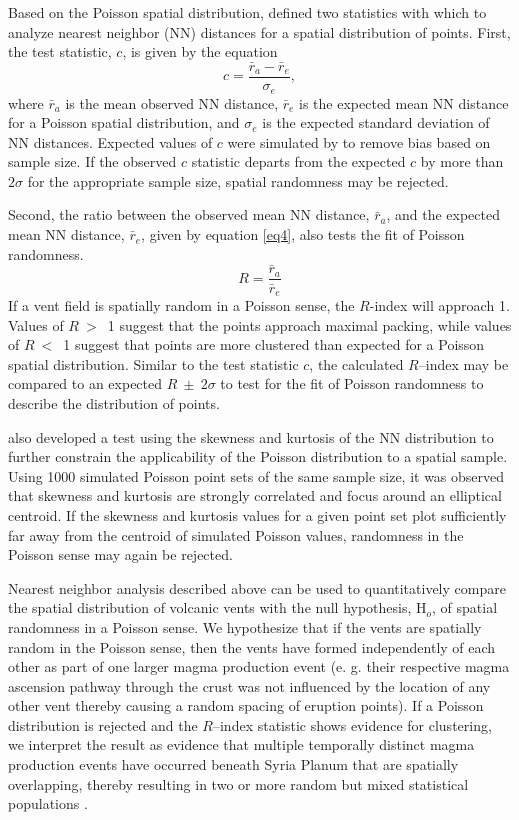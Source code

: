Based on the Poisson spatial distribution, \citet{Clark1954} defined two statistics with which to analyze nearest neighbor (NN) distances for a spatial distribution of points. First, the test statistic, $c$, is given by the equation 
\begin{equation}
c= \frac{\bar{r}_a -\bar{r}_e}{\sigma_e},  \label{eq3}
\end{equation}
where $\bar{r}_a$ is the mean observed NN distance, $\bar{r}_e$ is the expected mean NN distance for a Poisson spatial distribution, and $\sigma_e$ is the expected standard deviation of NN distances. Expected values of $c$ were simulated by \citet{Baloga2007} to remove bias based on sample size. If the observed $c$ statistic departs from the expected $c$ by more than $2\sigma$ for the appropriate sample size, spatial randomness may be rejected.

Second, the ratio between the observed mean NN distance, $\bar{r}_a$, and the expected mean NN distance, $\bar{r}_e$, given by equation \ref{eq4}, also tests the fit of Poisson randomness.
\begin{equation}
R = \frac{\bar{r}_a}{\bar{r}_e} \label{eq4}
\end{equation}
If a vent field is spatially random in a Poisson sense, the $R$-index will approach 1. Values of $R~>$~1 suggest that the points approach maximal packing, while values of $R~<$~1 suggest that points are more clustered than expected for a Poisson spatial distribution. Similar to the test statistic $c$, the calculated $R$--index may be compared to an expected $R~\pm~2\sigma$ to test for the fit of Poisson randomness to describe the distribution of points.

\citet{Baloga2007} also developed a test using the skewness and kurtosis of the NN distribution to further constrain the applicability of the Poisson distribution to a spatial sample. Using 1000 simulated Poisson point sets of the same sample size, it was observed that skewness and kurtosis are strongly correlated and focus around an elliptical centroid.  If the skewness and kurtosis values for a given point set plot sufficiently far away from the centroid of simulated Poisson values, randomness in the Poisson sense may again be rejected.

Nearest neighbor analysis described above can be used to quantitatively compare the spatial distribution of volcanic vents with the null hypothesis, H$_o$, of spatial randomness in a Poisson sense. We hypothesize that if the vents are spatially random in the Poisson sense, then the vents have formed independently of each other as part of one larger magma production event (e. g. their respective magma ascension pathway through the crust was not influenced by the location of any other vent thereby causing a random spacing of eruption points). If a Poisson distribution is rejected and the $R$--index statistic shows evidence for clustering, we interpret the result as evidence that multiple temporally distinct magma production events have occurred beneath Syria Planum that are spatially overlapping, thereby resulting in two or more random but mixed statistical populations \citep{Lutz1986,Lutz1995}.

